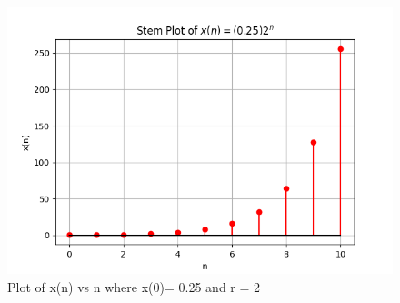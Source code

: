 \documentclass[journal,12pt,twocolumn]{IEEEtran}
\theoremstyle{remark}
\begin{document}
\begin{figure}[htbp]
   \centering
   \includegraphics[width=1\columnwidth]{figs/gp.png}
   \caption{Plot of x(n) vs n where x(0)= 0.25 and r = 2}
   \label{fig: Stem plot of x(n)}
\end{figure}
\end{document}
